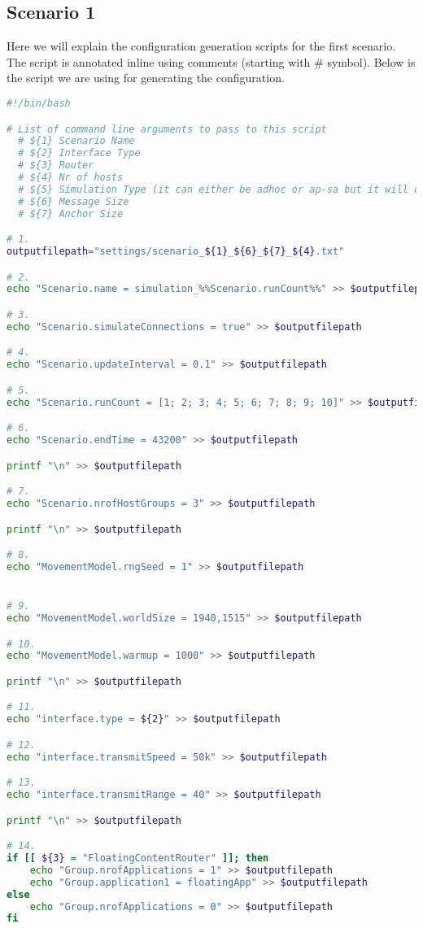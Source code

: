 \subsection{Scenario 1}
Here we will explain the configuration generation scripts for the first scenario. The script is annotated inline using comments (starting with \# symbol). Below is the script we are using for generating the configuration.
\begin{lstlisting}[language=bash]
#!/bin/bash

# List of command line arguments to pass to this script
  # ${1} Scenario Name
  # ${2} Interface Type
  # ${3} Router
  # ${4} Nr of hosts
  # ${5} Simulation Type (it can either be adhoc or ap-sa but it will only work if ${2} is WifiInterface)
  # ${6} Message Size
  # ${7} Anchor Size

# 1.
outputfilepath="settings/scenario_${1}_${6}_${7}_${4}.txt"

# 2.
echo "Scenario.name = simulation_%%Scenario.runCount%%" >> $outputfilepath

# 3.
echo "Scenario.simulateConnections = true" >> $outputfilepath

# 4.
echo "Scenario.updateInterval = 0.1" >> $outputfilepath

# 5.
echo "Scenario.runCount = [1; 2; 3; 4; 5; 6; 7; 8; 9; 10]" >> $outputfilepath

# 6.
echo "Scenario.endTime = 43200" >> $outputfilepath

printf "\n" >> $outputfilepath

# 7.
echo "Scenario.nrofHostGroups = 3" >> $outputfilepath

printf "\n" >> $outputfilepath

# 8.
echo "MovementModel.rngSeed = 1" >> $outputfilepath


# 9.
echo "MovementModel.worldSize = 1940,1515" >> $outputfilepath

# 10.
echo "MovementModel.warmup = 1000" >> $outputfilepath

printf "\n" >> $outputfilepath

# 11.
echo "interface.type = ${2}" >> $outputfilepath

# 12.
echo "interface.transmitSpeed = 50k" >> $outputfilepath

# 13.
echo "interface.transmitRange = 40" >> $outputfilepath

printf "\n" >> $outputfilepath

# 14.
if [[ ${3} = "FloatingContentRouter" ]]; then
	echo "Group.nrofApplications = 1" >> $outputfilepath
	echo "Group.application1 = floatingApp" >> $outputfilepath
else
	echo "Group.nrofApplications = 0" >> $outputfilepath
fi


\end{lstlisting}
